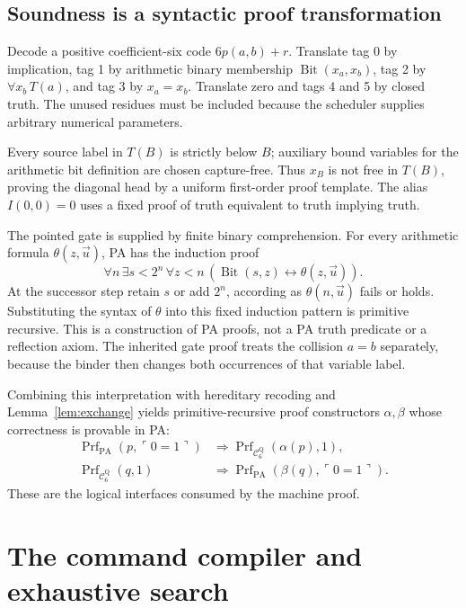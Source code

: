 \documentclass[11pt,letterpaper]{article}
\newcommand{\PA}{\mathrm{PA}}
\newcommand{\Prf}{\operatorname{Prf}}
\newcommand{\CQ}{\mathcal C^{\mathrm Q}_6}
\begin{document}
\subsection{Soundness is a syntactic proof transformation}

Decode a positive coefficient-six code \(6p(a,b)+r\). Translate tag 0 by
implication, tag 1 by arithmetic binary membership
\(\operatorname{Bit}(x_a,x_b)\), tag 2 by
\(\forall x_b\,T(a)\), and tag 3 by \(x_a=x_b\). Translate zero and
tags 4 and 5 by closed truth. The unused residues must be included because
the scheduler supplies arbitrary numerical parameters.

Every source label in \(T(B)\) is strictly below \(B\); auxiliary bound
variables for the arithmetic bit definition are chosen capture-free.
Thus \(x_B\) is not free in \(T(B)\), proving the diagonal head by a
uniform first-order proof template. The alias \(I(0,0)=0\) uses a fixed
proof of truth equivalent to truth implying truth.

The pointed gate is supplied by finite binary comprehension. For every
arithmetic formula \(\theta(z,\vec u)\), PA has the induction proof
\[
 \forall n\,\exists s<2^n\,\forall z<n\,
  (\operatorname{Bit}(s,z)\leftrightarrow\theta(z,\vec u)).
\]
At the successor step retain \(s\) or add \(2^n\), according as
\(\theta(n,\vec u)\) fails or holds. Substituting the syntax of \(\theta\)
into this fixed induction pattern is primitive recursive. This is a
construction of PA proofs, not a PA truth predicate or a reflection axiom.
The inherited gate proof treats the collision \(a=b\) separately, because
the binder then changes both occurrences of that variable label.

Combining this interpretation with hereditary recoding and
Lemma~\ref{lem:exchange} yields primitive-recursive proof constructors
\(\alpha,\beta\) whose correctness is provable in PA:
\begin{align*}
 \Prf_{\PA}(p,\ulcorner0=1\urcorner)
   &\Longrightarrow \Prf_{\CQ}(\alpha(p),1),\\
 \Prf_{\CQ}(q,1)
   &\Longrightarrow \Prf_{\PA}(\beta(q),\ulcorner0=1\urcorner).
\end{align*}
These are the logical interfaces consumed by the machine proof.

\section{The command compiler and exhaustive search}\label{sec:commands}
\end{document}
